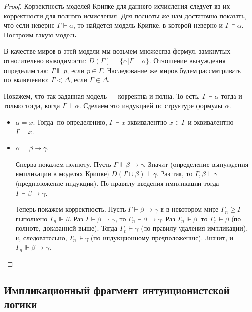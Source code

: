 \begin{proof}
Корректность моделей Крипке для данного исчисления следует из их корректности
для полного исчисления. Для полноты же нам достаточно показать, что если 
неверно $\Gamma\vdash\alpha$, то найдется
модель Крипке, в которой неверно и $\Gamma\models\alpha$. 
Построим такую модель.

В качестве миров в этой модели мы возьмем множества формул, замкнутых относительно
выводимости: $D(\Gamma) = \{ \alpha | \Gamma\vdash\alpha \}$. 
Отношение вынуждения определим так: $\Gamma\Vdash p$, если $p \in \Gamma$.
Наследование же миров будем рассматривать по включению: $\Gamma < \Delta$, если
$\Gamma \in \Delta$.

Покажем, что так заданная модель --- корректна и полна. То есть, 
$\Gamma\vdash\alpha$ тогда и только тогда, когда $\Gamma\Vdash\alpha$. 
Сделаем это индукцией по структуре формулы $\alpha$.

\begin{itemize}
\item $\alpha = x$. Тогда, по определению, $\Gamma\vdash x$ эквивалентно 
$x \in \Gamma$ и эквивалентно $\Gamma\Vdash x$.
\item $\alpha = \beta\rightarrow\gamma$.

Сперва покажем полноту.
Пусть $\Gamma\Vdash\beta\rightarrow\gamma$. Значит (определение вынуждения
импликации в моделях Крипке) $D(\Gamma\cup\beta)\Vdash\gamma$. Раз так, то 
$\Gamma,\beta\vdash\gamma$ (предположение индукции). По правилу введения 
импликации тогда $\Gamma\vdash\beta\rightarrow\gamma$.

Теперь покажем корректность.
Пусть $\Gamma\vdash\beta\rightarrow\gamma$ и в некотором мире 
$\Gamma_n \ge \Gamma$ выполнено $\Gamma_n\Vdash\beta$.
Раз $\Gamma \vdash\beta\rightarrow\gamma$, то $\Gamma_n\vdash\beta\rightarrow\gamma$.
Раз $\Gamma_n\Vdash\beta$, то $\Gamma_n\vdash\beta$ (по полноте, доказанной выше).
Тогда $\Gamma_n\vdash\gamma$ (по правилу удаления импликации), 
и, следовательно, $\Gamma_n\Vdash\gamma$ (по индукционному предположению).
Значит, и $\Gamma_n\Vdash\beta\rightarrow\gamma$.
\end{itemize}

\end{proof}


\subsection{Импликационный фрагмент интуиционистской логики}

